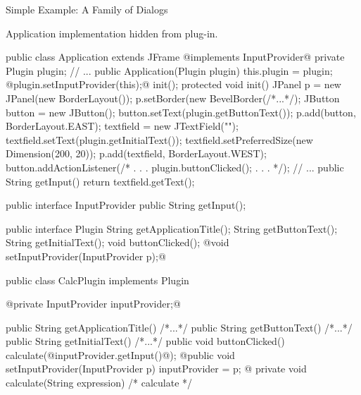 \begin{frame}[fragile]{Simple Example: A Family of Dialogs}
	\begin{mycolumns}[columns=2,widths={50,50}]
		\begin{note}{}
			Application implementation hidden from plug-in.
		\end{note}
\begin{codetight}[basicstyle=\tiny]{}
public class Application extends JFrame @implements InputProvider@ {
	private Plugin plugin;
	// ...
	public Application(Plugin plugin) {
		this.plugin = plugin;
		@plugin.setInputProvider(this);@
		init();
	}
	protected void init() {
		JPanel p = new JPanel(new BorderLayout());
		p.setBorder(new BevelBorder(/*...*/);
		JButton button = new JButton();
		button.setText(plugin.getButtonText());
		p.add(button, BorderLayout.EAST);
		textfield = new JTextField("");
		textfield.setText(plugin.getInitialText());
		textfield.setPreferredSize(new Dimension(200, 20));
		p.add(textfield, BorderLayout.WEST);		
		button.addActionListener(/* . . . plugin.buttonClicked(); . . . */);		
		// ...
	}
	public String getInput() {
		return textfield.getText();
	}
}
\end{codetight}
		\mynextcolumn
{
\begin{codetight}[basicstyle=\tiny]{}
public interface InputProvider {
	public String getInput();
}
\end{codetight}
\begin{codetight}[basicstyle=\tiny]{}
public interface Plugin {
	String getApplicationTitle();
	String getButtonText();
	String getInitialText();
	void buttonClicked();
	@void setInputProvider(InputProvider p);@
}
\end{codetight}
\begin{codetight}[basicstyle=\tiny]{}
public class CalcPlugin implements Plugin {
	@private InputProvider inputProvider;@

	public String getApplicationTitle() { /*...*/ }
	public String getButtonText() { /*...*/ }
	public String getInitialText() { /*...*/ }
	public void buttonClicked() {
		calculate(@inputProvider.getInput()@);
	}
	@public void setInputProvider(InputProvider p) {
		inputProvider = p;
	}@
	private void calculate(String expression) {
		/* calculate */
	}
}
\end{codetight}
}
	\end{mycolumns}
\end{frame}

